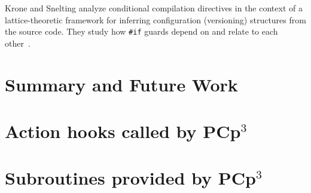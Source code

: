 \documentclass{article}
\newcommand{\pcp}{\mbox{\textsf{PCp}$^3$}}
\newcommand{\ppd}[1]{\texttt{\##1}}
\begin{document}
Krone and Snelting analyze conditional compilation directives in the
context of a lattice-theoretic framework for inferring configuration
(versioning) structures from the source code.  They study how \ppd{if} guards
depend on and relate to each other~\cite{Krone94}.

\section{Summary and Future Work}
\label{sec:summary}



\appendix
\newpage

\section{Action hooks called by \pcp}
\begin{footnotesize}
\label{sec:hooks}
\begin{itemize}
\sloppy

\fussy
\end{itemize}
\end{footnotesize}

\newpage

\section{Subroutines provided by \pcp}
\label{sec:backcalls}
\begin{footnotesize}
\begin{itemize}
\sloppy

\fussy
\end{itemize}
\end{footnotesize}

\newpage

\nocite{ARM}
\nocite{Dragon}
\nocite{Glickstein97} %
\nocite{Camel}        %
\nocite{Perl}        %
\nocite{Levine92}     %
\nocite{Harbison91}   %
\nocite{Stroustrup97} %
\nocite{Stroustrup94} %
\nocite{Kernighan88}  %
\nocite{Flanagan96}   %
\nocite{EmpCpp}
\nocite{EmpCpp-TR}
\nocite{GCC}
\nocite{CTree}
\nocite{TXL}
\nocite{Cordy92}
\nocite{Bison}
\nocite{Flex}
\nocite{Krone94}
\nocite{Griswold96}
\nocite{Atkinson96}
\nocite{CD2DraftStandard}



\end{document}
